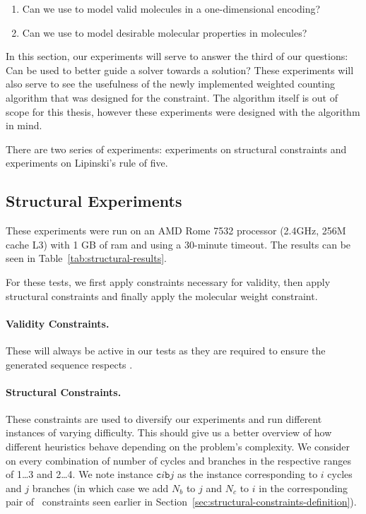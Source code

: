 \documentclass[../Document.tex]{subfiles}
\begin{document}
\begin{enumerate}
    \item Can we use \cp to model valid molecules in a one-dimensional encoding?
    \item Can we use \cp to model desirable molecular properties in \smiles molecules?
\end{enumerate}

In this section, our experiments will serve to answer the third of our questions: Can \bp be used to better guide a solver towards a solution?
These experiments will also serve to see the usefulness of the newly implemented weighted counting algorithm that was designed for the \grammar constraint.
The algorithm itself is out of scope for this thesis, however these experiments were designed with the algorithm in mind.

There are two series of experiments: experiments on structural constraints and experiments on Lipinski's rule of five.

\subsection{Structural Experiments}
These experiments were run on an AMD Rome 7532 processor (2.4GHz, 256M cache L3) with 1 GB of \gls{ram} and using a 30-minute timeout. The results can be seen in Table~\ref{tab:structural-results}.

For these tests, we first apply constraints necessary for validity, then apply structural constraints and finally apply the molecular weight constraint.

\paragraph{Validity Constraints.} These will always be active in our tests as they are required to ensure the generated sequence respects \smiles.

\paragraph{Structural Constraints.} These constraints are used to diversify our experiments and run different instances of varying difficulty. This should give us a better overview of how different heuristics behave depending on the problem's complexity. We consider on every combination of number of cycles and branches in the respective ranges of 1\ldots3 and 2\ldots4. We note instance $\mathtt{c}i\mathtt{b}j$ as the instance corresponding to $i$ cycles and $j$ branches (in which case we add $N_b$ to $j$ and $N_c$ to $i$ in the corresponding pair of \among\ constraints seen earlier in Section~\ref{sec:structural-constraints-definition}).
\end{document}
